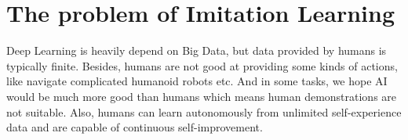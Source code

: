 \documentclass[nobib]{tufte-handout}
\begin{document}
\section{The problem of Imitation Learning}
Deep Learning is heavily depend on Big Data, but data provided by humans is typically finite. Besides, humans are not good at providing some kinds of actions, like navigate complicated humanoid robots etc. And in some tasks, we hope AI would be much more good than humans which means human demonstrations are not suitable. Also, humans can learn autonomously from unlimited self-experience data and are capable of continuous self-improvement.


\nocite{*}
\footnotesize


\end{document}

